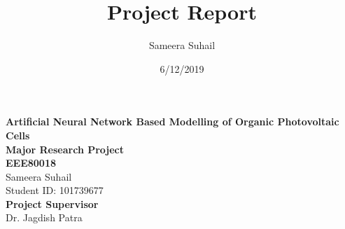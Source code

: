 \documentclass[]{article}
\title{Project Report}
\author{Sameera Suhail}
\date{6/12/2019}
\begin{document}
\maketitle


\onehalfspacing
{}

\begin{center}
\vspace*{2\baselineskip}
\LARGE{\textbf{Artificial Neural Network Based Modelling of Organic Photovoltaic Cells}}\\
\vspace*{1\baselineskip}
\vspace*{2\baselineskip}
\Large{\textbf{Major Research Project }}\\
\Large{\textbf{EEE80018 }}\\
\vspace*{2\baselineskip}
\vspace*{2\baselineskip}
\Large{Sameera Suhail}\\
\Large{Student ID: 101739677}\\
\vspace*{1\baselineskip}
\vspace*{2\baselineskip}
\vspace*{3\baselineskip}
\Large{\textbf{Project Supervisor}}\\
Dr. Jagdish Patra\\
\end{center}

\doublespacing


\hypersetup{linkcolor = black}
\newpage
{}
\tableofcontents
{}


\doublespacing

\newpage
{}
\hypersetup{linkcolor = blue}


\doublespacing
\end{document}

